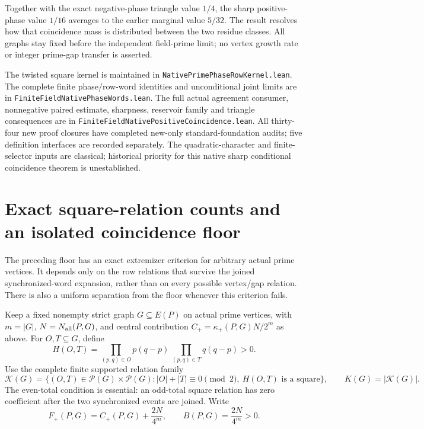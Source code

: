 \documentclass[11pt]{article}
\begin{document}
Together with the exact negative-phase triangle value \(1/4\), the
sharp positive-phase value \(1/16\) averages to the earlier marginal
value \(5/32\). The result resolves how that coincidence mass is
distributed between the two residue classes.
All graphs stay fixed before the independent field-prime limit;
no vertex growth rate or integer prime-gap transfer is asserted.

The twisted square kernel is maintained in
\texttt{NativePrimePhaseRowKernel.lean}.
The complete finite phase/row-word identities and unconditional
joint limits are in \texttt{FiniteFieldNativePhaseWords.lean}.
The full actual agreement consumer, nonnegative paired estimate,
sharpness, reservoir family and triangle consequences are in
\texttt{FiniteFieldNativePositiveCoincidence.lean}.
All thirty-four new proof closures have completed new-only
standard-foundation audits; five definition interfaces are recorded
separately. The quadratic-character and finite-selector inputs are
classical; historical priority for this native sharp conditional
coincidence theorem is unestablished.

\section{Exact square-relation counts and an isolated coincidence floor}
\label{sec:native-coincidence-gap}

The preceding floor has an exact extremizer criterion for arbitrary
actual prime vertices. It depends only on the row relations that survive
the joined synchronized-word expansion, rather than on every possible
vertex/gap relation. There is also a uniform separation from the floor
whenever this criterion fails.

Keep a fixed nonempty strict graph \(G\subseteq E(P)\) on actual prime
vertices, with \(m=|G|\), \(N=N_{\rm all}(P,G)\), and central contribution
\(C_+=\kappa_+(P,G)N/2^m\) as above. For \(O,T\subseteq G\), define
\[
 H(O,T)=
 \prod_{(p,q)\in O}p(q-p)\,
 \prod_{(p,q)\in T}q(q-p)>0.
\]
Use the complete finite supported relation family
\[
 \mathcal K(G)=
 \{(O,T)\in\mathcal P(G)\times\mathcal P(G):
       |O|+|T|\equiv0\pmod2,\ H(O,T)\text{ is a square}\},
 \qquad K(G)=|\mathcal K(G)|.
\]
The even-total condition is essential: an odd-total square relation
has zero coefficient after the two synchronized events are joined.
Write
\[
 F_+(P,G)=C_+(P,G)+\frac{2N}{4^m},
 \qquad B(P,G)=\frac{2N}{4^m}>0.
\]
\end{document}
